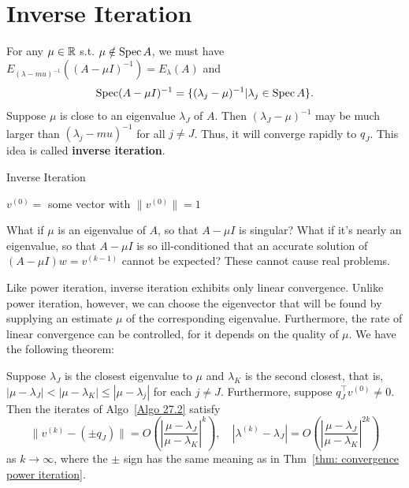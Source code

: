 \section{Inverse Iteration} 
For any $\mu\in \mathbb{R}$ s.t. $\mu \notin \operatorname{Spec} A$, we must have $E_{(\lambda-mu)^{-1} } ( (A-\mu I)^{-1})  = E_\lambda (A)$ and 
\[
    \operatorname{Spec} (A - \mu I )^{-1}  = \{(\lambda _j -\mu)^{-1} | \lambda _j \in \operatorname{Spec} A\}.  
\]
Suppose $\mu$ is close to an eigenvalue $\lambda _J$ of $A$. Then $(\lambda _J - \mu)^{-1} $ may be much larger than $ (\lambda _j - mu)^{-1}  $ for all $ j\neq J $. Thus, it will converge rapidly to $q_J$. This idea is called \textbf{inverse iteration}. 

\begin{algorithm}[H]
    \caption{Inverse Iteration}
    \label{Algo 27.2}
$ v^{(0)}= $ some vector with $ \|v^{(0)}\|=1 $\; 
\end{algorithm}

What if $\mu$ is an eigenvalue of $A$, so that $A- \mu I$ is singular? What if it's nearly an eigenvalue, so that $ A-\mu I $ is so ill-conditioned that an accurate solution of $(A-\mu I) w = v^{(k-1)}$ cannot be expected? These cannot cause real problems. 

Like power iteration, inverse iteration exhibits only linear convergence. Unlike power iteration, however, we can choose the eigenvector that will be found by supplying an estimate $\mu$ of the corresponding eigenvalue. Furthermore, the rate of linear convergence can be controlled, for it depends on the quality of $\mu$. We have the following theorem: 


\begin{theorem}
\label{thm: convergence inverse iteration}
Suppose $ \lambda _J $ is the closest eigenvalue to $ \mu  $ and $ \lambda _K $ is the second closest, that is, $ |\mu-\lambda _J| < |\mu-\lambda _K|\le |\mu-\lambda _j| $ for each $ j\neq J $. Furthermore, suppose $ q_J^\top  v^{(0)}\neq 0 $. Then the iterates of Algo~\ref{Algo 27.2} satisfy 
\[
    \|v^{(k)}- (\pm q_J) \| = O \left( \left| \frac{\mu - \lambda _J}{\mu - \lambda _K} \right| ^k \right) , \quad |\lambda ^{(k)} - \lambda _J| = O\left( \left| \frac{\mu - \lambda _J}{\mu-\lambda _K} \right| ^{2k} \right) 
\]
as $k\to \infty$, where the $\pm$ sign has the same meaning as in Thm~\ref{thm: convergence power iteration}. 
\end{theorem}

